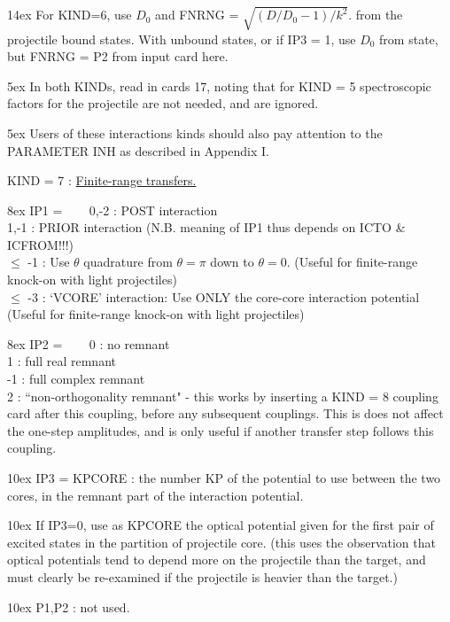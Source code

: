 \documentclass[11pt]{article}
\begin{document}
\hangindent 14ex
For KIND=6, use $D_0$ and FNRNG = $\sqrt{(D/D_0 - 1)/k^2}$. from the projectile
bound states.  With unbound states, or if IP3 = 1,
use $D_0$ from state, but FNRNG = P2
from input card here.

\hangindent 5ex
 In both KINDs, read in cards 17, noting that for KIND = 5
spectroscopic factors for the projectile are not needed, and are ignored.

\hangindent 5ex
Users of these interactions kinds should also pay attention to the
PARAMETER INH as described in Appendix I.
\bigskip

KIND = 7 :
\underline{Finite-range transfers.}


\hangindent 8ex  IP1 =
~~~  0,-2 : POST interaction
\\  1,-1 : PRIOR interaction
 (N.B. meaning of IP1 thus depends on ICTO \& ICFROM!!!)
\\  $\le$ -1 : Use $\theta$ quadrature from $\theta = \pi$ down to $\theta = 0$.
 (Useful for finite-range knock-on with light projectiles)
\\  $\le$ -3 : `VCORE' interaction:
Use ONLY the core-core interaction potential
 (Useful for finite-range knock-on with light projectiles)



\hangindent 8ex  IP2 =
~~~  0 : no remnant
\\  1 : full real remnant
\\  -1 : full complex remnant
\\  2 : ``non-orthogonality remnant" - this works by inserting
a KIND = 8 coupling card after this coupling, before any subsequent
couplings.
This is does not affect the one-step amplitudes, and is only useful
if another transfer step follows this coupling.



\hangindent 10ex
 IP3 = KPCORE : the number KP of the potential to use between
the two cores, in the remnant part of the interaction potential.

\hangindent 10ex
       If IP3=0, use as KPCORE the optical potential given for
the first pair of excited states in the partition of projectile core.
(this uses the observation that optical potentials tend to depend
more on the projectile than the target, and must clearly be re-examined
if the projectile is heavier than the target.)

\hangindent 10ex
 P1,P2 : not used.
\bigskip
\end{document}
